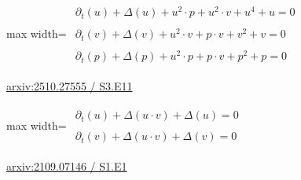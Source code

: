 \documentclass[UTF8,10pt,a4paper,fontset=mac]{ctexart}
\begin{document}
\begin{minipage}{\linewidth}\begin{center}\begin{adjustbox}{max width=\linewidth}$\displaystyle\begin{gathered}\begin{gathered}\partial_{t}(u)+\Delta(u)+u^{2}\cdot p+u^{2}\cdot v+u^{4}+u=0\end{gathered}\\[5pt]\begin{gathered}\partial_{t}(v)+\Delta(v)+u^{2}\cdot v+p\cdot v+v^{2}+v=0\end{gathered}\\[5pt]\begin{gathered}\partial_{t}(p)+\Delta(p)+u^{2}\cdot p+p\cdot v+p^{2}+p=0\end{gathered}\end{gathered}$\end{adjustbox}\end{center}{\small\href{https://arxiv.org/html/2510.27555#S3.E11}{arxiv:2510.27555 / S3.E11}}\par\end{minipage}\par\vspace{6mm}

\begin{minipage}{\linewidth}\begin{center}\begin{adjustbox}{max width=\linewidth}$\displaystyle\begin{gathered}\begin{gathered}\partial_{t}(u)+\Delta(u\cdot v)+\Delta(u)=0\end{gathered}\\[5pt]\begin{gathered}\partial_{t}(v)+\Delta(u\cdot v)+\Delta(v)=0\end{gathered}\end{gathered}$\end{adjustbox}\end{center}{\small\href{https://arxiv.org/html/2109.07146#S1.E1}{arxiv:2109.07146 / S1.E1}}\par\end{minipage}\par\vspace{6mm}
\end{document}
